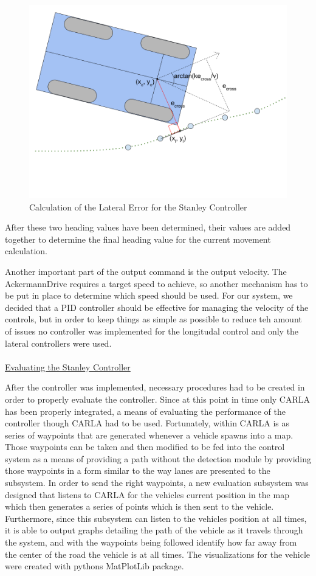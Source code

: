 \documentclass[titlepage,draft]{article}
\begin{document}
{\begin{figure}
	\centering
	\includegraphics[width=5in]{stanley_lateral_error}
	\caption{Calculation of the Lateral Error for the Stanley Controller}
	\label{fig:stanley_lateral_calc}
\end{figure}

After these two heading values have been determined, their values are added together to determine the final heading value for the current movement calculation.

Another important part of the output command is the output velocity. The AckermannDrive requires a target speed to achieve, so another mechanism has to be put in place to determine which speed should be used. For our system, we decided that a PID controller should be effective for managing the velocity of the controls, but in order to keep things as simple as possible to reduce teh amount of issues no controller was implemented for the longitudal control and only the lateral controllers were used.\\~\\
\underline{Evaluating the Stanley Controller}

After the controller was implemented, necessary procedures had to be created in order to properly evaluate the controller. Since at this point in time only CARLA has been properly integrated, a means of evaluating the performance of the controller though CARLA had to be used. Fortunately, within CARLA is as series of waypoints that are generated whenever a vehicle spawns into a map. Those waypoints can be taken and then modified to be fed into the control system as a means of providing a path without the detection module by providing those waypoints in a form similar to the way lanes are presented to the subsystem. In order to send the right waypoints, a new evaluation subsystem was designed that listens to CARLA for the vehicles current position in the map which then generates a series of points which is then sent to the vehicle. Furthermore, since this subsystem can listen to the vehicles position at all times, it is able to output graphs detailing the path of the vehicle as it travels through the system, and with the waypoints being followed identify how far away from the center of the road the vehicle is at all times. The visualizations for the vehicle were created with pythons MatPlotLib package.

}
\end{document}
